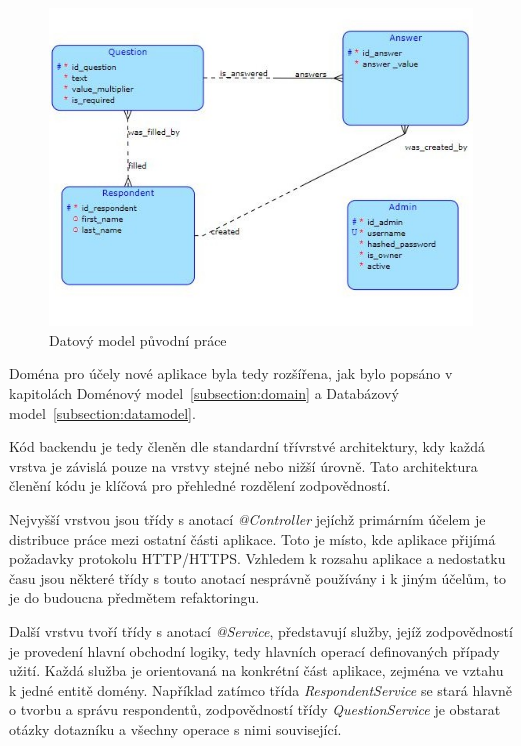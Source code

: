 \begin{figure}[h!]
    \centering
    \includegraphics[width=\textwidth]{images/dataModel.JPG}
    \caption{Datový model původní práce}
    \label{fig:originaldatamodel}
\end{figure}

Doména pro účely nové aplikace byla tedy rozšířena, jak bylo popsáno v kapitolách Doménový model~\ref{subsection:domain}
a Databázový model~\ref{subsection:datamodel}.

Kód backendu je tedy členěn dle standardní třívrstvé architektury, kdy každá vrstva je závislá pouze na vrstvy stejné nebo nižší úrovně. 
Tato architektura členění kódu je klíčová pro přehledné rozdělení zodpovědností.

Nejvyšší vrstvou jsou třídy s anotací \textit{@Controller} jejíchž primárním účelem je distribuce práce mezi ostatní části aplikace.
Toto je místo, kde aplikace přijímá požadavky protokolu HTTP/HTTPS. Vzhledem k rozsahu aplikace a nedostatku času jsou některé třídy
s touto anotací nesprávně používány i k jiným účelům, to je do budoucna předmětem refaktoringu.

Další vrstvu tvoří třídy s anotací \textit{@Service}, představují služby, jejíž zodpovědností je provedení hlavní
obchodní logiky, tedy hlavních operací definovaných případy užití. Každá služba je
orientovaná na konkrétní část aplikace, zejména ve vztahu k jedné entitě domény.
Například zatímco třída \textit{RespondentService} se stará hlavně o tvorbu a správu
respondentů, zodpovědností třídy \textit{QuestionService} je obstarat otázky dotazníku a 
všechny operace s nimi související.

